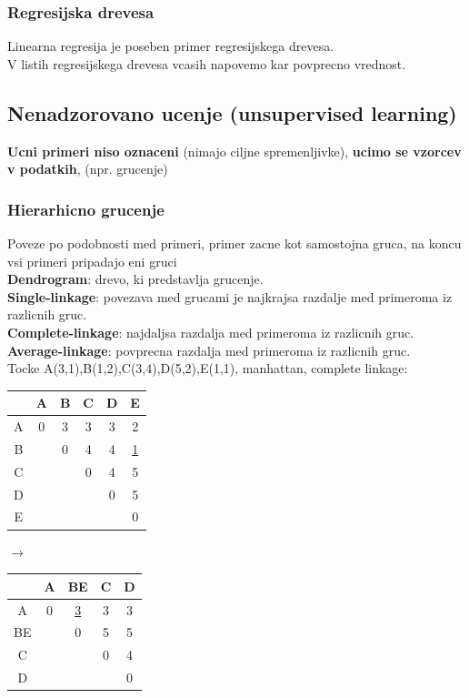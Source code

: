 \subsubsection{Regresijska drevesa}
Linearna regresija je poseben primer regresijskega drevesa.\\
V listih regresijskega drevesa vcasih napovemo kar povprecno vrednost.

\subsection{Nenadzorovano ucenje (unsupervised learning)}
\textbf{Ucni primeri niso oznaceni} (nimajo ciljne spremenljivke),
\textbf{ucimo se vzorcev v podatkih}, (npr. grucenje)

\subsubsection{Hierarhicno grucenje}
Poveze po podobnosti med primeri, primer zacne kot samostojna gruca, na koncu vsi primeri pripadajo eni gruci\\
\textbf{Dendrogram}: drevo, ki predstavlja grucenje.\\
\textbf{Single-linkage}: povezava med grucami je najkrajsa razdalje med primeroma iz razlicnih gruc.\\
\textbf{Complete-linkage}: najdaljsa razdalja med primeroma iz razlicnih gruc.\\
\textbf{Average-linkage}: povprecna razdalja med primeroma iz razlicnih gruc.\\
Tocke A(3,1),B(1,2),C(3,4),D(5,2),E(1,1), manhattan, complete linkage:
\begin{tabular}{c|ccccc}
    & A & B & C & D & E\\
    \hline
    A & 0 & 3 & 3 & 3 & 2\\
    B &   & 0 & 4 & 4 & \underline{1}\\
    C &   &   & 0 & 4 & 5\\
    D &   &   &   & 0 & 5\\
    E &   &   &   &   & 0\\
\end{tabular}
$\rightarrow$
\begin{tabular}{c|cccc}
    & A & BE & C & D\\
    \hline
    A & 0 & \underline{3} & 3 & 3\\
    BE &   & 0 & 5 & 5\\
    C &  &   & 0 & 4\\
    D &   &   &   & 0\\
\end{tabular}
